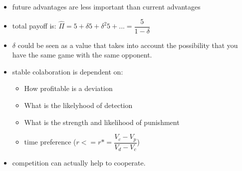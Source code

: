 \documentclass[12pt, a4paper, titlepage]{extarticle}
\begin{document}
\begin{itemize}
\begin{itemize}
        \item future advantages are less important than current advantages
        \item total payoff is: $\widehat \Pi = 5 + \delta 5 + \delta ^2 5 + ... = \dfrac{5}{1-\delta}$
        \item $\delta$ could be seen as a value that takes into account the possibility that you have the same game with the same opponent.             
        \item stable colaboration is dependent on:
        \begin{itemize}
            \item How profitable is a deviation
            \item What is the likelyhood of detection
            \item What is the strength and likelihood of punishment
            \item time preference ($r<= r* = \dfrac{V_c-V_p}{V_d-V_c}$)
        \end{itemize}
        \item competition can actually help to cooperate.
        \end{itemize}
    \end{itemize}
    
\end{document}
